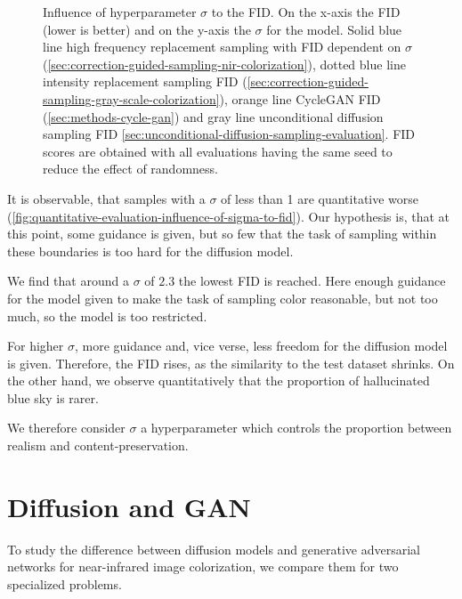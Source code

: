 \begin{figure}[htp!]
    \begin{center}
        
    \end{center}
    \caption{
        Influence of hyperparameter $\sigma$ to the FID.
        On the x-axis the FID (lower is better) and on the y-axis the $\sigma$ for the model.
        \textcolor{ub-blue}{Solid blue line} high frequency replacement sampling with FID dependent on $\sigma$ (\autoref{sec:correction-guided-sampling-nir-colorization}),
        \textcolor{ub-blue}{dotted blue line} intensity replacement sampling FID (\autoref{sec:correction-guided-sampling-gray-scale-colorization}),
        \textcolor{ub-yellow}{orange line} CycleGAN FID (\autoref{sec:methods-cycle-gan}) and \textcolor{ub-gray}{gray line} unconditional diffusion sampling FID \autoref{sec:unconditional-diffusion-sampling-evaluation}.
        FID scores are obtained with all evaluations having the same seed to reduce the effect of randomness.    
    }
    \label{fig:quantitative-evaluation-influence-of-sigma-to-fid}
\end{figure}

It is observable, that samples with a $\sigma$ of less than 1 are quantitative worse (\autoref{fig:quantitative-evaluation-influence-of-sigma-to-fid}).
Our hypothesis is, that at this point, some guidance is given, but so few that the task of sampling within these boundaries is too hard for the diffusion model.

We find that around a $\sigma$ of $2.3$ the lowest FID is reached. 
Here enough guidance for the model given to make the task of sampling color reasonable, but not too much, so the model is too restricted. 

For higher $\sigma$, more guidance and, vice verse, less freedom for the diffusion model is given. 
Therefore, the FID rises, as the similarity to the test dataset shrinks.
On the other hand, we observe quantitatively that the proportion of hallucinated blue sky is rarer.

We therefore consider $\sigma$ a hyperparameter which controls the proportion between realism and content-preservation. 

\section{Diffusion and GAN}
\label{sec:diffusion-vs-cyclegan}
To study the difference between diffusion models and generative adversarial networks for near-infrared image colorization, we compare them for two specialized problems.

